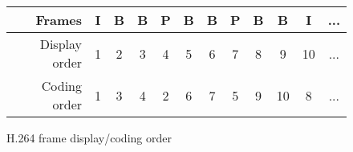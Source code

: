 \begin{figure}
\centering
{\setlength{\tabcolsep}{3pt}
\begin{tabular}{|r||ccccccccc|cc|}
\hline
Frames                                                       & I & B & B & P & B & B & P & B & B  & I  & ... \\ \hline
Display order                                                & 1 & 2 & 3 & 4 & 5 & 6 & 7 & 8 & 9  & 10 & ... \\ \hline
Coding order & 1 & 3 & 4 & 2 & 6 & 7 & 5 & 9 & 10 & 8  & ... \\
\hline
\end{tabular}}
\caption{H.264 frame display/coding order}
\label{fig:frame-order}
\end{figure}